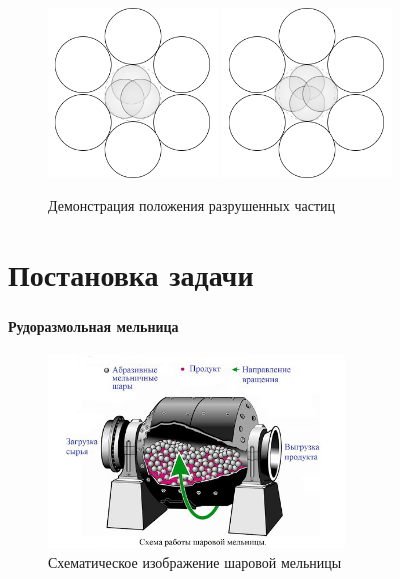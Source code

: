 \documentclass[c]{beamer}  %
\begin{document}
\begin{frame}
\frametitle{\insertsection} 
\framesubtitle{\insertsubsection}
\begin{figure}[h!]
	\centering
	\includegraphics[width=0.4\textwidth]{3_balls}
	\includegraphics[width=0.4\textwidth]{4_balls}
	\caption{Демонстрация положения разрушенных частиц}
\end{figure} 
\end{frame}


\section{Постановка задачи}


\begin{frame}
\frametitle{\insertsection}
\framesubtitle{Рудоразмольная мельница}
\begin{figure}[H]
	\centering
	\includegraphics[width=0.7\textwidth]{mill_nice} 
	\caption{Схематическое изображение шаровой мельницы}
	\label{pic:mill_end}
\end{figure} 

\end{frame}
\end{document}
